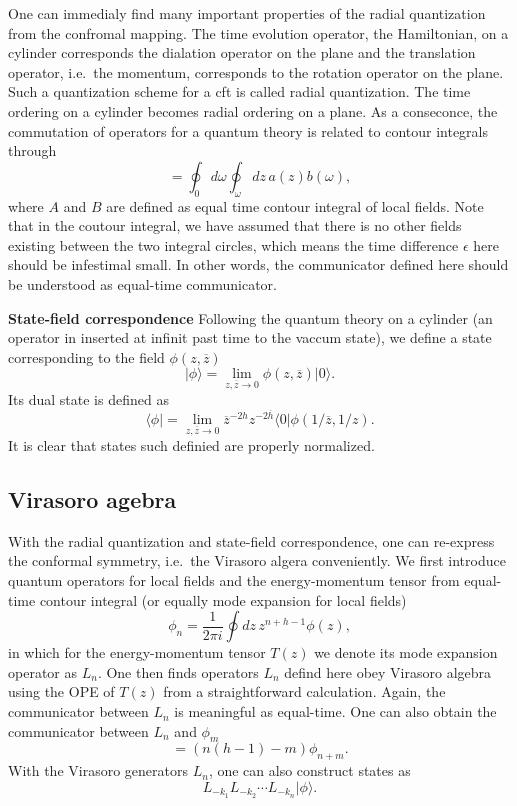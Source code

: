 \documentclass[submission, PhysLectNotes]{SciPost}
\begin{document}
One can immedialy find many important properties of the radial quantization from the confromal mapping. The time evolution operator, the Hamiltonian, on a cylinder corresponds the dialation operator on the plane and the translation operator, i.e.\  the momentum, corresponds to the rotation operator on the plane. Such a quantization scheme for a cft is called radial quantization. The time ordering on a cylinder becomes radial ordering on a plane. As  a conseconce, the commutation of operators for a quantum theory is related to contour integrals through
\begin{equation}
	[A,B] = \oint_0 d\omega \oint_\omega dz \, a(z)b(\omega),
\end{equation}
where $A$ and $B$ are defined as equal time contour integral of local fields. Note that in the coutour integral, we have assumed that there is no other fields existing between the two integral circles, which means the time difference $\epsilon$ here should be infestimal small. In other words, the communicator defined here should be understood as equal-time communicator.

{\bf State-field correspondence} Following the quantum theory on a cylinder (an operator in inserted at infinit past time to the vaccum state), we define a state corresponding to the field $\phi(z,\overline{z})$
\begin{equation}
	\vert \phi \rangle = \lim_{z,\overline{z}\to 0}\phi(z,\overline{z})\vert0\rangle.
\end{equation}
Its dual state is defined as
\begin{equation}
	\langle \phi \vert = \lim_{z,\overline{z}\to 0} \overline{z}^{-2h}z^{-2\overline{h}} \langle 0 \vert \phi(1/\overline{z},1/z).
\end{equation}
It is clear that states such definied are properly normalized.

\subsection{Virasoro agebra}
With the radial quantization and state-field correspondence, one can re-express the conformal symmetry, i.e.\ the Virasoro algera conveniently.  We first introduce quantum operators for local fields and the energy-momentum tensor from equal-time contour integral (or equally mode expansion for local fields)
\begin{equation}
	\phi_n = \frac{1}{2\pi i}\oint dz \, z^{n+h-1} \phi(z),
\end{equation}
in which for the energy-momentum tensor $T(z)$ we denote its mode expansion operator as $L_n$. One then finds operators $L_n$ defind here obey Virasoro algebra using the OPE of $T(z)$ from a straightforward calculation. Again, the communicator between $L_n$ is meaningful as equal-time. One can also obtain the communicator between $L_n$ and $\phi_m$
\begin{equation}
	[L_n, \phi_m] = \left(n(h-1)-m\right) \phi_{n+m}.
\end{equation}
With the Virasoro generators $L_n$, one can also construct states as
\begin{equation}
L_{-k_1}L_{-k_2} \cdots L_{-k_n} \vert \phi \rangle.
\end{equation}
\end{document}
